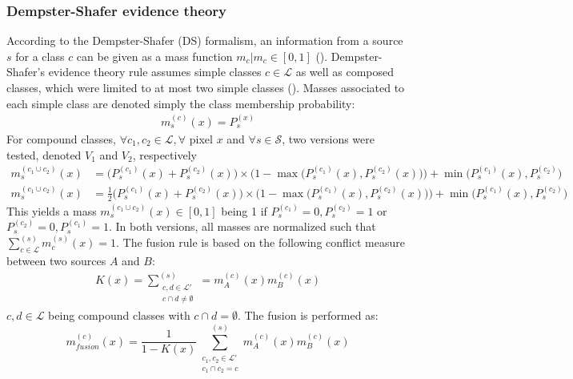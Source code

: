 \documentclass[10pt]{article}
\begin{document}
\subsubsection{Dempster-Shafer evidence theory}\label{sec:DS}
According to the Dempster-Shafer (DS) formalism, an information from a source $s$ for a class $c$ can be given as a mass function $m_c\vert m_c\in [0,1]$ (\cite{shafer-evidence}). Dempster-Shafer's evidence theory rule assumes simple classes $c\in \mathcal{L}$ as well as composed classes, which were limited to at most two simple classes (\cite{ouerghemmi_two-step_2017}). Masses associated to each simple class are denoted simply the class membership probability:
\begin{align}
    m_s^{(c)}(x)=P_s^{(x)}
\end{align}
For compound classes, $\forall c_1,c_2\in \mathcal{L}, \forall$ pixel $x$ and $\forall s\in \mathcal{S}$, two versions were tested, denoted $V_1$ and $V_2$, respectively
\begin{align}
    m_s^{(c_1\cup c_2)}(x)&=\big(P_s^{(c_1)}(x)+P_s^{(c_2)}(x)\big)\times \Big(1-\max\big(P_s^{(c_1)}(x),P_s^{(c_2)}(x)\big)\Big)+\min\big(P_s^{(c_1)}(x),P_s^{(c_2)}\big)\\
    m_s^{(c_1\cup c_2)}(x)&=\frac{1}{2}\big(P_s^{(c_1)}(x)+P_s^{(c_2)}(x)\big)\times \Big(1-\max\big(P_s^{(c_1)}(x),P_s^{(c_2)}(x)\big)\Big)+\min\big(P_s^{(c_1)}(x),P_s^{(c_2)}\big)
\end{align}
This yields a mass $m_s^{(c_1\cup c_2)}(x)\in [0,1]$ being 1 if $P_s^{(c_1)}=0, P_s^{(c_2)}=1$ or $P_s^{(c_2)}=0, P_s^{(c_1)}=1$. In both versions, all masses are normalized such that $\sum_{c \in \mathcal{L}}^{(s)}m_c^{(s)}(x)=1$.
The fusion rule is based on the following conflict measure between two sources $A$ and $B$:
\begin{align}
    K(x)=\sum_{\substack{c,d\in\mathcal{L}'\\c\cap d\neq\emptyset}}^{(s)}=m_A^{(c)}(x)m_B^{(c)}(x)
\end{align}
$c,d\in\mathcal{L}$ being compound classes with $c\cap d =\emptyset$. The fusion is performed as:
\begin{equation}
    m_{fusion}^{(c)}(x)=\frac{1}{1-K(x)}\sum_{\substack{c_1,c_2\in\mathcal{L}'\\c_1 \cap c_2 = c}}^{(s)}m_A^{(c)}(x)m_B^{(c)}(x)
\end{equation}
\end{document}
